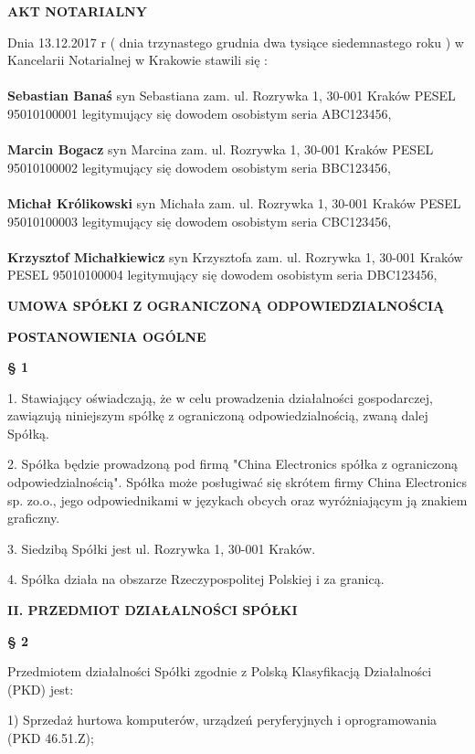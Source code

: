 \centerline{\huge\textbf{AKT NOTARIALNY}}
\bigskip
Dnia 13.12.2017 r  ( dnia trzynastego grudnia dwa tysiące siedemnastego roku ) w Kancelarii Notarialnej w Krakowie stawili się :\\ \\
\textbf{Sebastian Banaś} syn Sebastiana zam. ul. Rozrywka 1, 30-001 Kraków PESEL 95010100001 legitymujący się dowodem osobistym seria ABC123456,\\ \\
\textbf{Marcin Bogacz} syn Marcina zam. ul. Rozrywka 1, 30-001 Kraków PESEL 95010100002 legitymujący się dowodem osobistym seria BBC123456,\\ \\
\textbf{Michał Królikowski} syn Michała zam. ul. Rozrywka 1, 30-001 Kraków PESEL 95010100003 legitymujący się dowodem osobistym seria CBC123456,\\ \\
\textbf{Krzysztof Michałkiewicz} syn Krzysztofa zam. ul. Rozrywka 1, 30-001 Kraków PESEL 95010100004 legitymujący się dowodem osobistym seria DBC123456,\\

\centerline{\large\textbf{UMOWA SPÓŁKI Z OGRANICZONĄ ODPOWIEDZIALNOŚCIĄ}}


\centerline{\large\textbf{POSTANOWIENIA OGÓLNE}}


\centerline{\large\textbf{§ 1}}

1. Stawiający oświadczają, że w celu prowadzenia działalności gospodarczej, zawiązują niniejszym spółkę z ograniczoną odpowiedzialnością, zwaną dalej Spółką.

2. Spółka będzie prowadzoną pod firmą "China Electronics spółka z ograniczoną odpowiedzialnością". Spółka może posługiwać się skrótem firmy China Electronics sp. zo.o., jego odpowiednikami w  językach obcych oraz wyróżniającym ją znakiem graficzny.

3. Siedzibą Spółki jest ul. Rozrywka 1, 30-001 Kraków.

4. Spółka działa na obszarze Rzeczypospolitej Polskiej i za granicą.\\

\centerline{\large\textbf{II. PRZEDMIOT DZIAŁALNOŚCI SPÓŁKI}}


\centerline{\large\textbf{§ 2}}

Przedmiotem działalności Spółki zgodnie z Polską Klasyfikacją Działalności (PKD) jest:

1) Sprzedaż hurtowa komputerów, urządzeń peryferyjnych i oprogramowania (PKD 46.51.Z);

